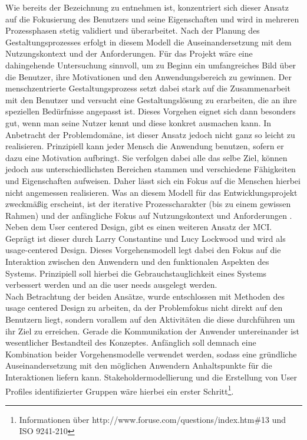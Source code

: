 Wie bereits der Bezeichnung zu entnehmen ist, konzentriert sich dieser Ansatz auf die Fokusierung des Benutzers und seine Eigenschaften und wird in mehreren Prozessphasen stetig validiert und überarbeitet. Nach der Planung des Gestaltungsprozesses erfolgt in diesem Modell die Auseinandersetzung mit dem Nutzungskontext und der Anforderungen. Für das Projekt wäre eine dahingehende Untersuchung sinnvoll, um zu Beginn ein umfangreiches Bild über die Benutzer, ihre Motivationen und den Anwendungsbereich zu gewinnen. 
Der menschzentrierte Gestaltungsprozess setzt dabei stark auf die Zusammenarbeit mit den Benutzer und versucht eine Gestaltungslösung zu erarbeiten, die an ihre speziellen Bedürfnisse angepasst ist. Dieses Vorgehen eignet sich dann besonders gut, wenn man seine Nutzer kennt und diese konkret ausmachen kann. In Anbetracht der Problemdomäne, ist dieser Ansatz jedoch nicht ganz so leicht zu realisieren. Prinzipiell kann jeder Mensch die Anwendung benutzen, sofern er dazu eine Motivation aufbringt. Sie verfolgen dabei alle das selbe Ziel, können jedoch aus unterschiedlichsten Bereichen stammen und verschiedene Fähigkeiten und Eigenschaften aufweisen. Daher lässt sich ein Fokus auf die Menschen hierbei nicht angemessen realisieren. Was an diesem Modell für das Entwicklungsprojekt zweckmäßig erscheint, ist der iterative Prozesscharakter (bis zu einem gewissen Rahmen) und der anfängliche Fokus auf Nutzungskontext und Anforderungen .\\
Neben dem User centered Design, gibt es einen weiteren Ansatz der MCI. Geprägt ist dieser durch Larry Constantine und Lucy Lockwood und wird als usage-centered Design. Dieses Vorgehensmodell legt dabei den Fokus auf die Interaktion zwischen den Anwendern und den funktionalen Aspekten des Systems. Prinzipiell soll hierbei die Gebrauchstauglichkeit eines Systems verbessert werden und an die user needs ausgelegt werden. \\
Nach Betrachtung der beiden Ansätze, wurde entschlossen mit Methoden des usage centered Design zu arbeiten, da der Problemfokus nicht direkt auf den Benutzern liegt, sondern vorallem auf den Aktivitäten die diese durchführen um ihr Ziel zu erreichen. Gerade die Kommunikation der Anwender untereinander ist wesentlicher Bestandteil des Konzeptes. Anfänglich soll demnach eine Kombination beider Vorgehensmodelle verwendet werden, sodass eine gründliche Auseinandersetzung mit den möglichen Anwendern Anhaltspunkte für die Interaktionen liefern kann. Stakeholdermodellierung und die Erstellung von User Profiles identifizierter Gruppen wäre hierbei ein erster Schritt\footnote{Informationen über http://www.foruse.com/questions/index.htm\#13 und ISO 9241-210}. 

\newpage



\newpage



\newpage



\newpage



\newpage



\newpage
